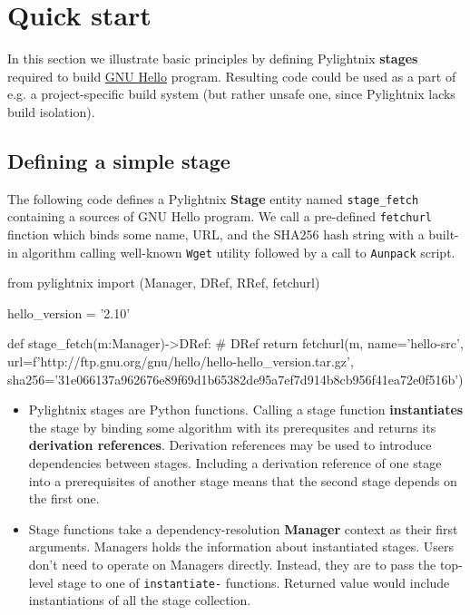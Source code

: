 \section{Quick start}

In this section we illustrate basic principles by defining Pylightnix
\textbf{stages} required to build \href{https://www.gnu.org/software/hello/}{GNU
Hello} program. Resulting code could be used as a part of e.g. a
project-specific build system (but rather unsafe one, since Pylightnix lacks
build isolation).

\subsection{Defining a simple stage}

The following code defines a Pylightnix \textbf{Stage} entity named
\texttt{stage\_fetch} containing a sources of GNU Hello program. We call a
pre-defined \texttt{fetchurl} finction which binds some name, URL, and the
SHA256 hash string with a built-in algorithm calling well-known \texttt{Wget}
utility followed by a call to \texttt{Aunpack} script.

\begin{pythontexcode}
from pylightnix import (Manager, DRef, RRef, fetchurl)

hello_version = '2.10'

def stage_fetch(m:Manager)->DRef: # DRef \label{DREF}
  return fetchurl(m,
    name='hello-src',
    url=f'http://ftp.gnu.org/gnu/hello/hello-{hello_version}.tar.gz',
    sha256='31e066137a962676e89f69d1b65382de95a7ef7d914b8cb956f41ea72e0f516b')
\end{pythontexcode}

\begin{itemize}

  \item Pylightnix stages are Python functions. Calling a stage function
    \textbf{instantiates} the stage by binding some algorithm with its
    prerequsites and returns its \textbf{derivation references}. Derivation
    references may be used to introduce dependencies between stages. Including
    a derivation reference of one stage into a prerequisites of another stage
    means that the second stage depends on the first one.

  \item Stage functions take a dependency-resolution \textbf{Manager} context as
    their first arguments. Managers holds the information about instantiated
    stages. Users don't need to operate on Managers directly. Instead, they are
    to pass the top-level stage to one of \texttt{instantiate-} functions.
    Returned value would include instantiations of all the stage collection.

\end{itemize}

